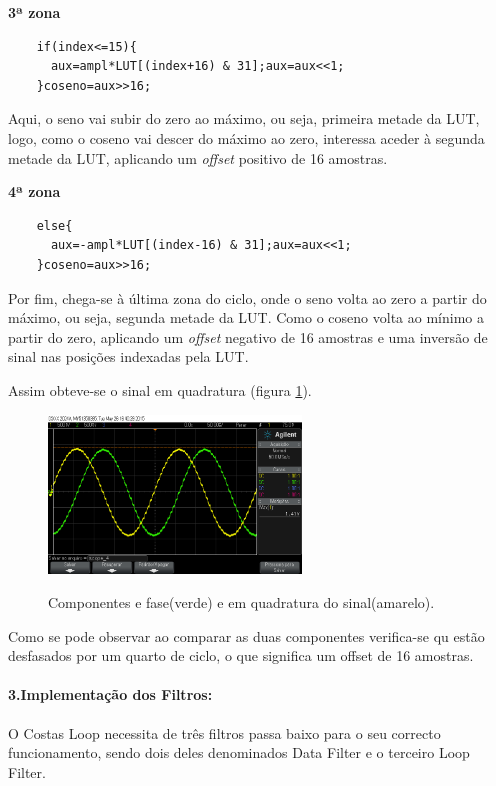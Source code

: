 \documentclass[11pt]{article}
\numberwithin{equation}{section}
\begin{document}
\textbf{3ª zona}
\begin{lstlisting}
	if(index<=15){
	  aux=ampl*LUT[(index+16) & 31];aux=aux<<1;
	}coseno=aux>>16;
\end{lstlisting}

Aqui, o seno vai subir do zero ao máximo, ou seja, primeira metade da LUT, logo, como o coseno vai descer do máximo ao zero, interessa aceder à segunda metade da LUT, aplicando um \textit{offset} positivo de 16 amostras.
\vspace{1mm}

\textbf{4ª zona}
\begin{lstlisting}
	else{
	  aux=-ampl*LUT[(index-16) & 31];aux=aux<<1;
	}coseno=aux>>16;
\end{lstlisting}

Por fim, chega-se à última zona do ciclo, onde o seno volta ao zero a partir do máximo, ou seja, segunda metade da LUT. Como o coseno volta ao mínimo a partir do zero, aplicando um \textit{offset} negativo de 16 amostras e uma inversão de sinal nas posições indexadas pela LUT.

Assim obteve-se o sinal em quadratura (figura \ref{quad}).
\begin{figure}[h]
	\centering     
	\includegraphics[width=0.6\textwidth]{./quadratura}~\\
	\caption{Componentes e fase(verde) e em quadratura do sinal(amarelo).}
	\label{quad}
\end{figure}

Como se pode observar ao comparar as duas componentes verifica-se qu estão desfasados por um quarto de ciclo, o que significa um offset de 16 amostras.
\paragraph{3.Implementação dos Filtros:} \hspace{0pt}   \label{para:P3-3}       

O Costas Loop necessita de três filtros passa baixo para o seu correcto funcionamento, sendo dois deles denominados Data Filter e o terceiro Loop Filter.
\end{document}
